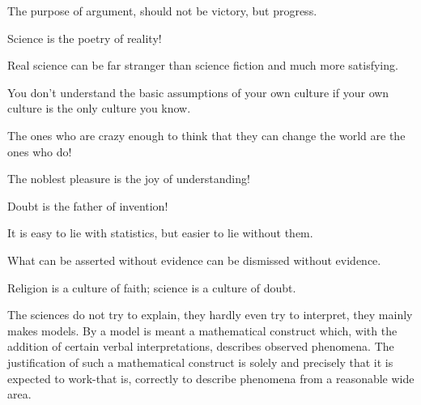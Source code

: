  	\begin{fuquote}[?]The purpose of argument, should not be victory, but progress.
 	\end{fuquote}
 	
 	\begin{fuquote}Science is the poetry of reality!
 	\end{fuquote}
 	
 	\begin{fuquote}Real science can be far stranger than science fiction and much more satisfying.
 	\end{fuquote}
 	
 	\begin{fuquote} You don't understand the basic assumptions of your own culture if your own culture is the only culture you know.
 	\end{fuquote}
 	
 	\begin{fuquote}The ones who are crazy enough to think that they can change the world are the ones who do!
 	\end{fuquote}
 	
 	\begin{fuquote}The noblest pleasure is the joy of understanding!
 	\end{fuquote}
 	
 	\begin{fuquote}Doubt is the father of invention!
 	\end{fuquote}
 	
 	\begin{fuquote}It is easy to lie with statistics, but easier to lie without them.
 	\end{fuquote}
 	
 	\begin{fuquote}What can be asserted without evidence can be dismissed without evidence.
 	\end{fuquote}
 	
 	\begin{fuquote}Religion is a culture of faith; science is a culture of doubt.
 	\end{fuquote}
 	
 	\begin{fuquote}The sciences do not try to explain, they hardly even try to interpret, they mainly makes models. By a model is meant a mathematical construct which, with the addition of certain verbal interpretations, describes observed phenomena. The justification of such a mathematical construct is solely and precisely that it is expected to work-that is, correctly to describe phenomena from a reasonable wide area.
 	\end{fuquote}
 	
